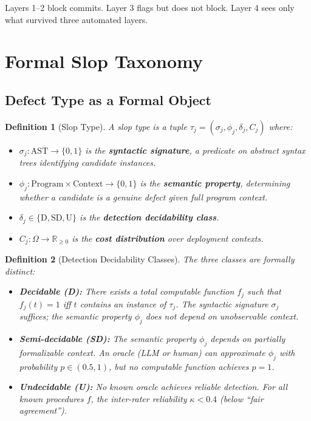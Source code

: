 \documentclass[11pt, a4paper, copyright]{googledeepmind}
\newtheorem{definition}{Definition}[section]
\begin{document}
Layers 1--2 block commits. Layer 3 flags but does not block. Layer 4 sees only what survived three automated layers.


\section{Formal Slop Taxonomy}
\label{sec:taxonomy}

\subsection{Defect Type as a Formal Object}

\begin{definition}[Slop Type]
\label{def:sloptype}
A slop type is a tuple $\tau_j = (\sigma_j, \phi_j, \delta_j, C_j)$ where:
\begin{itemize}
\item $\sigma_j : \mathrm{AST} \to \{0, 1\}$ is the \textbf{syntactic signature}, a predicate on abstract syntax trees identifying candidate instances.
\item $\phi_j : \mathrm{Program} \times \mathrm{Context} \to \{0, 1\}$ is the \textbf{semantic property}, determining whether a candidate is a genuine defect given full program context.
\item $\delta_j \in \{\mathrm{D}, \mathrm{SD}, \mathrm{U}\}$ is the \textbf{detection decidability class}.
\item $C_j : \Omega \to \mathbb{R}_{\geq 0}$ is the \textbf{cost distribution} over deployment contexts.
\end{itemize}
\end{definition}

\begin{definition}[Detection Decidability Classes]
\label{def:decidability}
The three classes are formally distinct:
\begin{itemize}
\item \textbf{Decidable (D):} There exists a total computable function $f_j$ such that $f_j(t) = 1$ iff $t$ contains an instance of $\tau_j$. The syntactic signature $\sigma_j$ suffices; the semantic property $\phi_j$ does not depend on unobservable context.

\item \textbf{Semi-decidable (SD):} The semantic property $\phi_j$ depends on partially formalizable context. An oracle (LLM or human) can approximate $\phi_j$ with probability $p \in (0.5, 1)$, but no computable function achieves $p = 1$.

\item \textbf{Undecidable (U):} No known oracle achieves reliable detection. For all known procedures $f$, the inter-rater reliability $\kappa < 0.4$ (below ``fair agreement'').
\end{itemize}
\end{definition}
\end{document}
